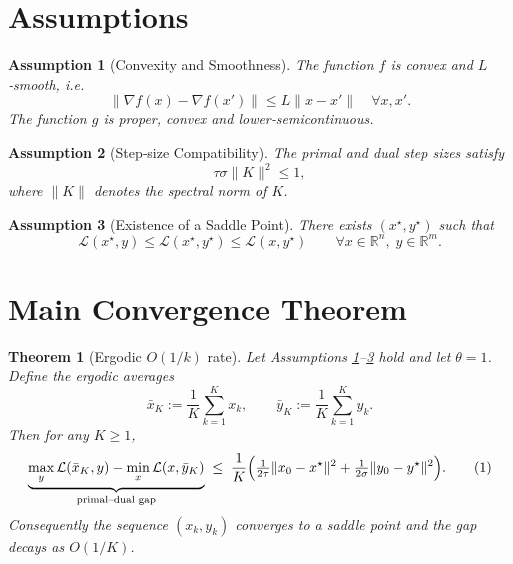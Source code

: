 \documentclass{article}
\newtheorem{theorem}{Theorem}[section]
\newtheorem{assumption}{Assumption}[section]
\begin{document}
\section*{Assumptions}
\begin{assumption}[Convexity and Smoothness]\label{as:convex}
The function $f$ is convex and $L$‑smooth, i.e.
\[
\|\nabla f(x)-\nabla f(x')\|\le L\|x-x'\|\quad\forall x,x'.
\]
The function $g$ is proper, convex and lower‑semicontinuous.
\end{assumption}
\begin{assumption}[Step‑size Compatibility]\label{as:steps}
The primal and dual step sizes satisfy
\[
\tau\sigma\|K\|^{2}\le 1,
\]
where $\|K\|$ denotes the spectral norm of $K$.
\end{assumption}
\begin{assumption}[Existence of a Saddle Point]\label{as:saddle}
There exists $(x^{\star},y^{\star})$ such that
\[
\mathcal{L}(x^{\star},y)\le\mathcal{L}(x^{\star},y^{\star})\le\mathcal{L}(x,y^{\star})
\qquad\forall x\in\mathbb{R}^{n},\;y\in\mathbb{R}^{m}.
\]
\end{assumption}

\section*{Main Convergence Theorem}
\begin{theorem}[Ergodic $O(1/k)$ rate]\label{thm:rate}
Let Assumptions \ref{as:convex}–\ref{as:saddle} hold and let $\theta=1$.
Define the ergodic averages
\[
\bar{x}_{K}:=\frac{1}{K}\sum_{k=1}^{K}x_{k},\qquad
\bar{y}_{K}:=\frac{1}{K}\sum_{k=1}^{K}y_{k}.
\]
Then for any $K\ge 1$,
\[
\underbrace{\max_{y}\mathcal{L}(\bar{x}_{K},y)-\min_{x}\mathcal{L}(x,\bar{y}_{K})}_{\text{primal–dual gap}}
\;\le\;
\frac{1}{K}\Bigl(\tfrac{1}{2\tau}\|x_{0}-x^{\star}\|^{2}
+\tfrac{1}{2\sigma}\|y_{0}-y^{\star}\|^{2}\Bigr).
\tag{1}
\]
Consequently the sequence $(x_{k},y_{k})$ converges to a saddle point and the gap decays as $O(1/K)$.
\end{theorem}

\end{document}
